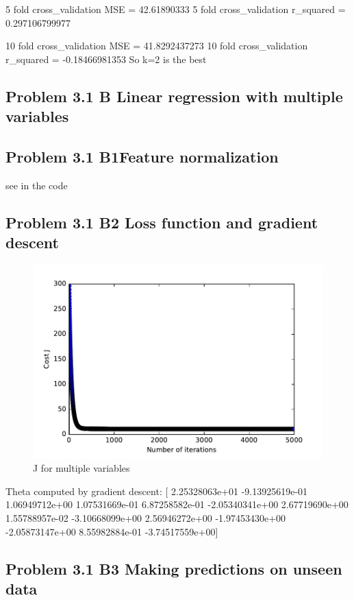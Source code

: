 \documentclass[pdftex,11pt]{article}
\begin{document}
5  fold cross\_validation MSE =  42.61890333
5  fold cross\_validation r\_squared =  0.297106799977

10  fold cross\_validation MSE =  41.8292437273
10  fold cross\_validation r\_squared =  -0.18466981353
So k=2 is the best








\subsection{Problem 3.1 B Linear regression with multiple variables}
\subsection{Problem 3.1 B1Feature normalization}
see in the code
\subsection{Problem 3.1 B2 Loss function and gradient descent}
\begin{figure}[H]
  \caption{J for multiple variables}
  \centering
    \includegraphics[scale=1]{fig5.pdf}
\end{figure}
Theta computed by gradient descent:  [  2.25328063e+01  -9.13925619e-01   1.06949712e+00   1.07531669e-01
   6.87258582e-01  -2.05340341e+00   2.67719690e+00   1.55788957e-02
  -3.10668099e+00   2.56946272e+00  -1.97453430e+00  -2.05873147e+00
   8.55982884e-01  -3.74517559e+00]

\subsection{Problem 3.1 B3 Making predictions on unseen data}
\end{document}
